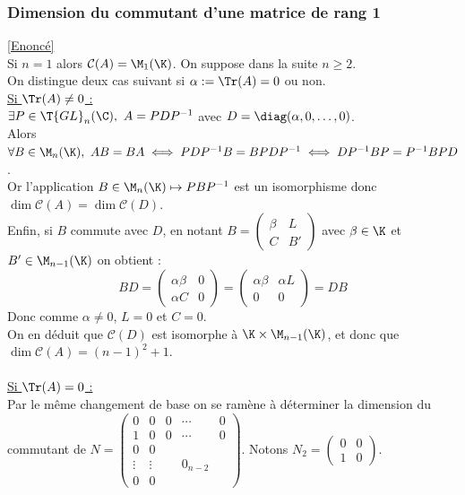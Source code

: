 \documentclass[8pt]{book}
\begin{document}
	\subsubsection{Dimension du commutant d'une matrice de rang 1 }
	\label{Dimension du commutant d'une matrice de rang 1 corrigé}
	\textcolor{blue}{\hyperref[Dimension du commutant d'une matrice de rang 1]{[Enoncé]}}\\
	Si $n=1$ alors $\mathcal C(A)=\M_1(\K)$. On suppose dans la suite $n\geq 2$.\\
	On distingue deux cas suivant si $\alpha:=\Tr(A)=0$ ou non.\\
	\underline{Si $\Tr(A)\ne 0$ :}\\
	$\exists P\in \T{GL}_n(\C),\ A=PDP^{-1}$ avec $D=\diag(\alpha,0,\dots,0)$.\\
	Alors $\forall B\in \M_n(\K),\ AB=BA\iff PDP^{-1}B=BPDP^{-1}\iff DP^{-1}BP=P^{-1}BPD$.\\
	Or l'application $B\in \M_n(\K)\mapsto PBP^{-1}$ est un isomorphisme donc $\dim\mathcal C(A)=\dim\mathcal C(D)$.\\
	Enfin, si $B$ commute avec $D$, en notant $B=\left(\begin{array}{c|c}
		\beta&L\\
		\hline
		C&B'
	\end{array}\right)$
	avec $\beta\in \K$ et $B'\in \M_{n-1}(\K)$ on obtient :
	$$BD=\left(\begin{array}{c|c}
		\alpha\beta&0\\
		\hline
		\alpha C&0
	\end{array}\right)=\left(\begin{array}{c|c}
	\alpha\beta&\alpha L\\
	\hline
	0&0
	\end{array}\right)=DB$$
	Donc comme $\alpha\ne 0$, $L=0$ et $C=0$.\\
	On en déduit que $\mathcal C(D)$ est isomorphe à $\K\times\M_{n-1}(\K)$, et donc que $\dim\mathcal C(A)=(n-1)^2+1$.\\\\
	\underline{Si $\Tr(A)=0$ :}\\
	Par le même changement de base on se ramène à déterminer la dimension du commutant de $N=\left(\begin{array}{cc|ccc}
		0&0&0&\cdots&0\\
		1&0&0&\cdots&0\\
		\hline
		0&0&&&\\
		\vdots&\vdots&&0_{n-2}&\\
		0&0&&&
	\end{array}\right)$. Notons $N_2=\begin{pmatrix}
	0&0\\
	1&0
	\end{pmatrix}$.\\
\end{document}
